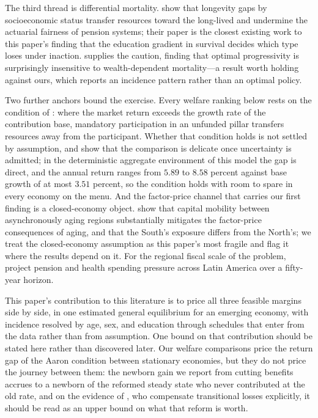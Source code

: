 \documentclass[12pt,a4paper]{article}
\begin{document}
The third thread is differential mortality. \citet{SanchezRomeroEtAl2020} show
that longevity gaps by socioeconomic status transfer resources toward the
long-lived and undermine the actuarial fairness of pension systems; their paper is the
closest existing work to this paper's finding that the education gradient in
survival decides which type loses under inaction. \citet{Bagchi2019} supplies
the caution, finding that optimal progressivity is surprisingly insensitive to
wealth-dependent mortality---a result worth holding against ours, which reports
an incidence pattern rather than an optimal policy.

Two further anchors bound the exercise. Every welfare ranking below rests on the
condition of \citet{Aaron1966}: where the market return exceeds the growth rate
of the contribution base, mandatory participation in an unfunded pillar
transfers resources away from the participant. Whether that condition holds is not settled by assumption, and \citet{AbelEtAl1989} show that the comparison is delicate once uncertainty is admitted; in the deterministic aggregate environment of this model the gap is direct, and the annual return ranges from $5.89$ to $8.58$ percent against base growth of at most $3.51$ percent, so the condition holds with room to spare in every economy on the menu. And the factor-price channel that carries
our first finding is a closed-economy object. \citet{AttanasioKitaoViolante2007}
show that capital mobility between asynchronously aging regions substantially
mitigates the factor-price consequences of aging, and that the South's exposure
differs from the North's; we treat the closed-economy assumption as this paper's
most fragile and flag it where the results depend on it. For the regional fiscal
scale of the problem, \citet{PessinoTerMinassian2021} project pension and health
spending pressure across Latin America over a fifty-year horizon.

This paper's contribution to this literature is to price all three feasible margins side by side, in one estimated general equilibrium for an emerging economy,
with incidence resolved by age, sex, and education through schedules that enter
from the data rather than from assumption. One bound on that contribution should be stated here rather than discovered later. Our welfare comparisons price the return gap of the Aaron condition between stationary economies, but they do not price the journey between them: the newborn gain we report from cutting benefits accrues to a newborn of the reformed steady state who never contributed at the old rate, and on the evidence of \citet{NishiyamaSmetters2007}, who compensate transitional losses explicitly, it should be read as an upper bound on what that reform is worth.
\end{document}
